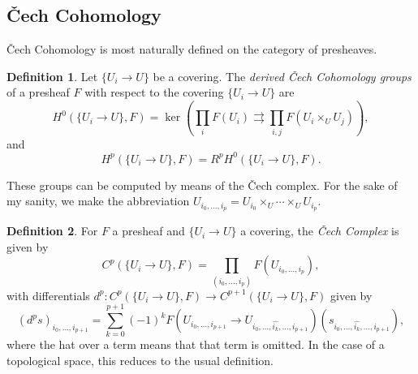 \documentclass[letterpaper,11pt]{article}
\theoremstyle{definition}
\newtheorem{defn}{Definition}
\theoremstyle{remark}
\begin{document}
\subsection{\v{C}ech Cohomology}

\v{C}ech Cohomology is most naturally defined on the category of presheaves.

\begin{defn} Let $\{U_i\rightarrow U\}$ be a covering. The \emph{derived \v{C}ech Cohomology groups} of a presheaf $F$ with respect to the covering $\{U_i\rightarrow U\}$ are
\[
H^0(\{U_i\rightarrow U\},F) = \ker(\prod_i F(U_i) \rightrightarrows \prod_{i,j} F(U_i \times_U U_j)),
\]
and
\[
H^p(\{U_i\rightarrow U\},F) = R^pH^0(\{U_i\rightarrow U\},F).
\]
\end{defn}

These groups can be computed by means of the \v{C}ech complex. For the sake of my sanity, we make the abbreviation $U_{i_0, ..., i_p} = U_{i_0} \times_U \cdots \times_U U_{i_p}$.

\begin{defn} For $F$ a presheaf and $\{U_i\rightarrow U\}$ a covering, the \emph{\v{C}ech Complex} is given by
\[
C^p(\{U_i\rightarrow U\}, F) = \prod_{(i_0, ..., i_p)} F(U_{i_0, ..., i_p}),
\]
with differentials $d^p:C^p(\{U_i\rightarrow U\}, F) \rightarrow C^{p+1}(\{U_i\rightarrow U\}, F)$ given by
\[
(d^ps)_{i_0, ..., i_{p+1}} = \sum_{k=0}^{p+1} (-1)^k F(U_{i_0, ..., i_{p+1}} \rightarrow U_{i_0, ..., \widehat{i_k}, ..., i_{p+1}})(s_{i_0, ..., \widehat{i_k}, ..., i_{p+1}}),
\]
where the hat over a term means that that term is omitted. In the case of a topological space, this reduces to the usual definition.
\end{defn}
\end{document}
